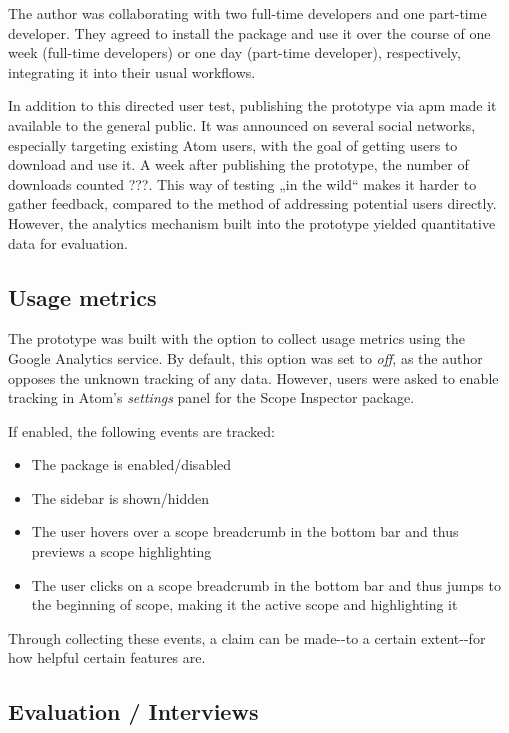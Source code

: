 The author was collaborating with two full-time developers and one
part-time developer. They agreed to install the package and use it over
the course of one week (full-time developers) or one day (part-time
developer), respectively, integrating it into their usual workflows.

In addition to this directed user test, publishing the prototype via
\ac{apm} made it available to the general public. It was announced on
several social networks, especially targeting existing Atom users, with
the goal of getting users to download and use it. A week after
publishing the prototype, the number of downloads counted ???. This way
of testing „in the wild“ makes it harder to gather feedback, compared to
the method of addressing potential users directly. However, the
analytics mechanism built into the prototype yielded quantitative data
for evaluation.

\subsection{Usage metrics}\label{usage-metrics}

The prototype was built with the option to collect usage metrics using
the Google Analytics service. By default, this option was set to
\emph{off}, as the author opposes the unknown tracking of any data.
However, users were asked to enable tracking in Atom’s \emph{settings}
panel for the Scope Inspector package.

If enabled, the following events are tracked:

\begin{itemize}
\itemsep1pt\parskip0pt
\item
  The package is enabled/disabled
\item
  The sidebar is shown/hidden
\item
  The user hovers over a scope breadcrumb in the bottom bar and thus
  previews a scope highlighting
\item
  The user clicks on a scope breadcrumb in the bottom bar and thus jumps
  to the beginning of scope, making it the active scope and highlighting
  it
\end{itemize}

Through collecting these events, a claim can be made-{}-to a certain
extent-{}-for how helpful certain features are.

\subsection{Evaluation / Interviews}\label{evaluation-interviews}

